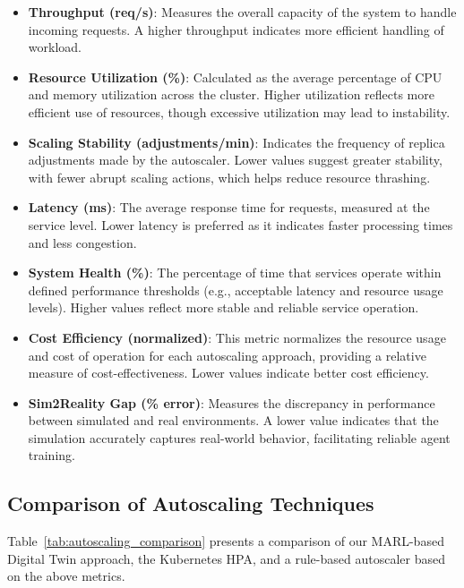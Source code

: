 \documentclass[conference]{IEEEtran}
\begin{document}
\begin{itemize}
    \item \textbf{Throughput (req/s)}: Measures the overall capacity of the system to handle incoming requests. A higher throughput indicates more efficient handling of workload.
    \item \textbf{Resource Utilization (\%)}: Calculated as the average percentage of CPU and memory utilization across the cluster. Higher utilization reflects more efficient use of resources, though excessive utilization may lead to instability.
    \item \textbf{Scaling Stability (adjustments/min)}: Indicates the frequency of replica adjustments made by the autoscaler. Lower values suggest greater stability, with fewer abrupt scaling actions, which helps reduce resource thrashing.
    \item \textbf{Latency (ms)}: The average response time for requests, measured at the service level. Lower latency is preferred as it indicates faster processing times and less congestion.
    \item \textbf{System Health (\%)}: The percentage of time that services operate within defined performance thresholds (e.g., acceptable latency and resource usage levels). Higher values reflect more stable and reliable service operation.
    \item \textbf{Cost Efficiency (normalized)}: This metric normalizes the resource usage and cost of operation for each autoscaling approach, providing a relative measure of cost-effectiveness. Lower values indicate better cost efficiency.
    \item \textbf{Sim2Reality Gap (\% error)}: Measures the discrepancy in performance between simulated and real environments. A lower value indicates that the simulation accurately captures real-world behavior, facilitating reliable agent training.
\end{itemize}

\subsection{Comparison of Autoscaling Techniques}

Table~\ref{tab:autoscaling_comparison} presents a comparison of our MARL-based Digital Twin approach, the Kubernetes HPA, and a rule-based autoscaler based on the above metrics.
\end{document}
